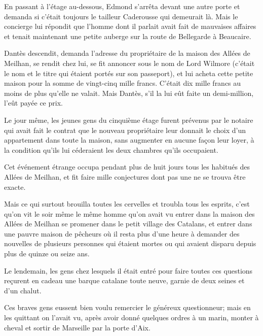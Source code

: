 En passant à l'étage au-dessous, Edmond s'arrêta devant une autre porte et demanda si c'était toujours le tailleur Caderousse qui demeurait là. Mais le concierge lui répondit que l'homme dont il parlait avait fait de mauvaises affaires et tenait maintenant une petite auberge sur la route de Bellegarde à Beaucaire.

Dantès descendit, demanda l'adresse du propriétaire de la maison des Allées de Meilhan, se rendit chez lui, se fit annoncer sous le nom de Lord Wilmore (c'était le nom et le titre qui étaient portés sur son passeport), et lui acheta cette petite maison pour la somme de vingt-cinq mille francs. C'était dix mille francs au moins de plus qu'elle ne valait. Mais Dantès, s'il la lui eût faite un demi-million, l'eût payée ce prix.

Le jour même, les jeunes gens du cinquième étage furent prévenus par le notaire qui avait fait le contrat que le nouveau propriétaire leur donnait le choix d'un appartement dans toute la maison, sans augmenter en aucune façon leur loyer, à la condition qu'ils lui céderaient les deux chambres qu'ils occupaient.

Cet événement étrange occupa pendant plus de huit jours tous les habitués des Allées de Meilhan, et fit faire mille conjectures dont pas une ne se trouva être exacte.

Mais ce qui surtout brouilla toutes les cervelles et troubla tous les esprits, c'est qu'on vit le soir même le même homme qu'on avait vu entrer dans la maison des Allées de Meilhan se promener dans le petit village des Catalans, et entrer dans une pauvre maison de pêcheurs où il resta plus d'une heure à demander des nouvelles de plusieurs personnes qui étaient mortes ou qui avaient disparu depuis plus de quinze ou seize ans.

Le lendemain, les gens chez lesquels il était entré pour faire toutes ces questions reçurent en cadeau une barque catalane toute neuve, garnie de deux seines et d'un chalut.

Ces braves gens eussent bien voulu remercier le généreux questionneur; mais en les quittant on l'avait vu, après avoir donné quelques ordres à un marin, monter à cheval et sortir de Marseille par la porte d'Aix.



